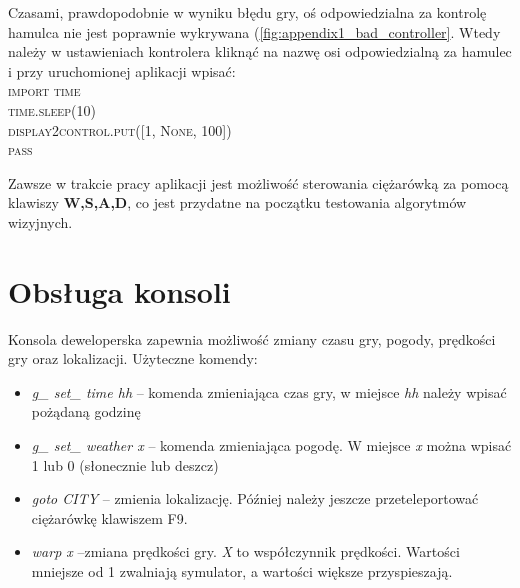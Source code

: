 Czasami, prawdopodobnie w wyniku błędu gry, oś odpowiedzialna za kontrolę hamulca nie jest poprawnie wykrywana (\ref{fig:appendix1_bad_controller}. Wtedy należy w ustawieniach kontrolera kliknąć na nazwę osi odpowiedzialną za hamulec i przy uruchomionej aplikacji wpisać:\\ \textsc{import time \\
time.sleep(10)\\
display2control.put([1, None, 100])\\
pass\\}

Zawsze w trakcie pracy aplikacji jest możliwość sterowania ciężarówką za pomocą klawiszy \textbf{W,S,A,D}, co jest przydatne na początku testowania algorytmów wizyjnych.

\section{Obsługa konsoli}
Konsola deweloperska zapewnia możliwość zmiany czasu gry, pogody, prędkości gry oraz lokalizacji. Użyteczne komendy:
\begin{itemize}
\item \textit{g\_ set\_ time hh} -- komenda zmieniająca czas gry, w miejsce \textit{hh} należy wpisać pożądaną godzinę
\item \textit{g\_ set\_ weather x} -- komenda zmieniająca pogodę. W miejsce \textit{x} można wpisać 1 lub 0 (słonecznie lub deszcz)
\item \textit{goto CITY} -- zmienia lokalizację. Później należy jeszcze przeteleportować ciężarówkę klawiszem F9.
\item \textit{warp x} --zmiana prędkości gry. \textit{X} to współczynnik prędkości. Wartości mniejsze od 1 zwalniają symulator, a wartości większe przyspieszają.
\end{itemize}
